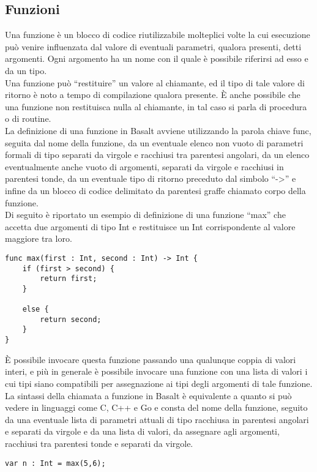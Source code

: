 \subsection{Funzioni}
Una funzione è un blocco di codice riutilizzabile molteplici volte la cui esecuzione può venire 
influenzata dal valore di eventuali parametri, qualora presenti, detti argomenti. Ogni argomento 
ha un nome con il quale è possibile riferirsi ad esso e da un tipo. \\

Una funzione può “restituire” un valore al chiamante, ed il tipo di tale valore di ritorno 
è noto a tempo di compilazione qualora presente. È anche possibile che una funzione 
non restituisca nulla al chiamante, in tal caso si parla di procedura o di routine. \\

La definizione di una funzione in Basalt avviene utilizzando la parola chiave func, seguita 
dal nome della funzione, da un eventuale elenco non vuoto di parametri 
formali di tipo separati da virgole e racchiusi tra parentesi angolari, 
da un elenco eventualmente anche vuoto di argomenti, separati da virgole e 
racchiusi in parentesi tonde, da un eventuale tipo di ritorno preceduto 
dal simbolo “->” e infine da un blocco di codice delimitato da parentesi graffe 
chiamato corpo della funzione. \\ 

Di seguito è riportato un esempio di definizione di una funzione “max” che accetta 
due argomenti di tipo Int e restituisce un Int corrispondente al valore maggiore tra loro.

\vspace{0.5cm}
\begin{lstlisting}[frame=single]
func max(first : Int, second : Int) -> Int {
    if (first > second) {
        return first; 
    }
    
    else {
        return second;
    }
}
\end{lstlisting}
\vspace{0.5cm}

È possibile invocare questa funzione passando una qualunque coppia di valori interi, 
e più in generale è possibile invocare una funzione con una lista di valori i cui tipi 
siano compatibili per assegnazione ai tipi degli argomenti di tale funzione. La sintassi 
della chiamata a funzione in Basalt è equivalente a quanto si può vedere in linguaggi 
come C, C++ e Go e consta del nome della funzione, seguito da una eventuale lista di 
parametri attuali di tipo racchiusa in parentesi angolari e separati da virgole e 
da una lista di valori, da assegnare agli argomenti, racchiusi tra parentesi tonde 
e separati da virgole.

\vspace{0.5cm}
\begin{lstlisting}[frame=single]
var n : Int = max(5,6);
\end{lstlisting}
\vspace{0.5cm}
\newpage


